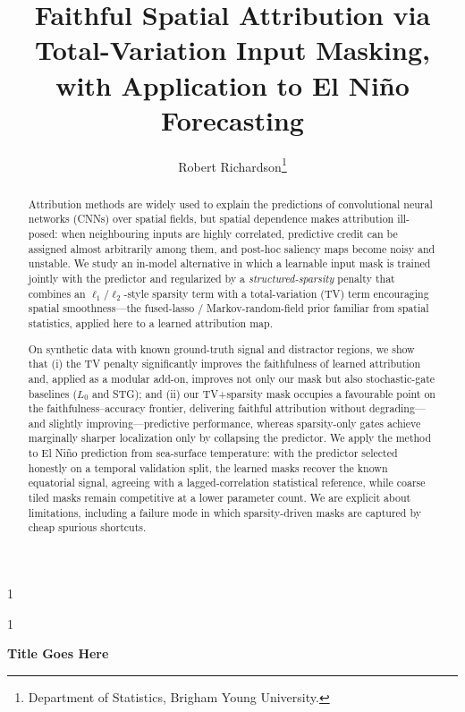 \documentclass[12pt]{article}
\newcommand{\anon}{1} %
\begin{document}
\def\spacingset#1{\renewcommand{\baselinestretch}{#1}\small\normalsize}
\spacingset{1}


\anon
{
  \title{\bf Faithful Spatial Attribution via Total-Variation Input Masking, with Application to El Ni\~no Forecasting}
  \author{Robert Richardson\thanks{
    Department of Statistics, Brigham Young University. }}
  \maketitle
} \fi

\anon
{
  \bigskip \bigskip \bigskip
  \begin{center}
    {\LARGE\bf Title Goes Here}
  \end{center}
  \medskip
} \fi

\bigskip
\begin{abstract}
Attribution methods are widely used to explain the predictions of convolutional neural networks (CNNs) over spatial fields, but spatial dependence makes attribution ill-posed: when neighbouring inputs are highly correlated, predictive credit can be assigned almost arbitrarily among them, and post-hoc saliency maps become noisy and unstable. We study an in-model alternative in which a learnable input mask is trained jointly with the predictor and regularized by a \emph{structured-sparsity} penalty that combines an $\ell_1/\ell_2$-style sparsity term with a total-variation (TV) term encouraging spatial smoothness---the fused-lasso / Markov-random-field prior familiar from spatial statistics, applied here to a learned attribution map.

On synthetic data with known ground-truth signal and distractor regions, we show that (i) the TV penalty significantly improves the faithfulness of learned attribution and, applied as a modular add-on, improves not only our mask but also stochastic-gate baselines ($L_0$ and STG); and (ii) our TV+sparsity mask occupies a favourable point on the faithfulness--accuracy frontier, delivering faithful attribution without degrading---and slightly improving---predictive performance, whereas sparsity-only gates achieve marginally sharper localization only by collapsing the predictor. We apply the method to El Ni\~no prediction from sea-surface temperature: with the predictor selected honestly on a temporal validation split, the learned masks recover the known equatorial signal, agreeing with a lagged-correlation statistical reference, while coarse tiled masks remain competitive at a lower parameter count. We are explicit about limitations, including a failure mode in which sparsity-driven masks are captured by cheap spurious shortcuts.
\end{abstract}
\end{document}
